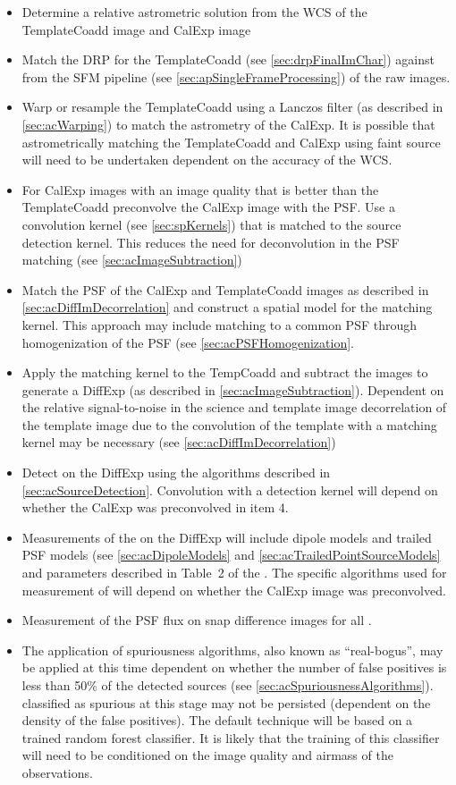 \begin{itemize}
\item Determine a relative astrometric solution from the WCS of the TemplateCoadd image and CalExp image
\item Match the DRP \Sources for the TemplateCoadd (see \ref{sec:drpFinalImChar}) against \Sources from the SFM pipeline (see \ref{sec:apSingleFrameProcessing}) of the raw images.
\item Warp or resample the TemplateCoadd using a Lanczos filter  (as described in \ref{sec:acWarping}) to match the astrometry of the CalExp. It is possible that astrometrically matching the TemplateCoadd and CalExp using faint source will need to be undertaken dependent on the accuracy of the WCS.
\item For CalExp images with an image quality that is better than the TemplateCoadd preconvolve the CalExp image with the PSF. Use a  convolution kernel (see \ref{sec:spKernels}) that is matched to the source detection kernel. This reduces the need for deconvolution in the PSF matching (see \ref{sec:acImageSubtraction})
\item Match the PSF of the CalExp and TemplateCoadd images as described in \ref{sec:acDiffImDecorrelation} and construct a spatial model for the matching kernel. This approach may include matching to a common PSF through homogenization of the PSF (see \ref{sec:acPSFHomogenization}.
\item Apply the matching kernel to the TempCoadd and subtract the images to generate a DiffExp (as described in \ref{sec:acImageSubtraction}). Dependent on the relative signal-to-noise in the science and template image decorrelation of the template image due to the convolution of the template with a matching kernel may be necessary (see \ref{sec:acDiffImDecorrelation})
\item Detect \DIASources on the DiffExp using the algorithms described in \ref{sec:acSourceDetection}. Convolution with a detection kernel will depend on whether the CalExp was preconvolved in item 4. 
\item Measurements of the \DIASources on the DiffExp will include dipole models and trailed PSF models (see  \ref{sec:acDipoleModels} and \ref{sec:acTrailedPointSourceModels} and parameters described in Table~2 of the \DPDD . The specific algorithms used for measurement of \DIASources will depend on whether the CalExp image was preconvolved.  
\item Measurement of the PSF flux on snap difference images for all \DIASources.
\item The application of spuriousness algorithms, also known as ``real-bogus'', may be applied at this time dependent on whether the number of false positives is less than 50\% of the detected sources (see \ref{sec:acSpuriousnessAlgorithms}). \DIASources classified as spurious at this stage may not be persisted (dependent on the density of the false positives). The default technique will be based on a trained random forest classifier. It is likely that the training of this classifier will need to be conditioned on the image quality and airmass of the observations.
\end{itemize}

